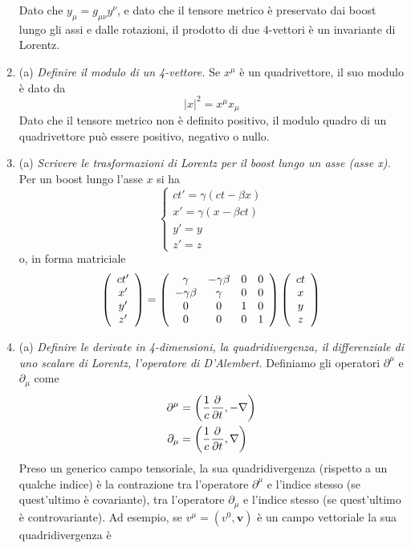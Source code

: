\documentclass{article}
\renewcommand{\a}{(a)}
\renewcommand{\t}[1]{\textit{ #1}}
\renewcommand{\vec}[1]{\mathbf{#1}}
\begin{document}
\begin{enumerate}
		Dato che $y_\mu=g_{\mu\nu}y^\nu$, e dato che il tensore metrico è preservato dai boost lungo gli assi e dalle rotazioni, il prodotto di due 4-vettori è un invariante di Lorentz.
		\item\a\t{Definire il modulo di un 4-vettore.} Se $x^\mu$ è un quadrivettore, il suo modulo è dato da
		\[|x|^2=x^\mu x_\mu\]
		Dato che il tensore metrico non è definito positivo, il modulo quadro di un quadrivettore può essere positivo, negativo o nullo.
		\item\a\t{Scrivere le trasformazioni di Lorentz per il boost lungo un asse (asse x).} Per un boost lungo l'asse $x$ si ha
		\[\begin{cases}
		ct'=\gamma(ct-\beta x)\\x'=\gamma(x-\beta ct)\\y'=y\\z'=z
		\end{cases}\]
		o, in forma matriciale
		\[\left(\begin{array}{c}
		ct'\\x'\\y'\\z'
		\end{array}\right)=\left(\begin{array}{c c c c}
		\gamma&-\gamma\beta&0&0\\-\gamma\beta&\gamma&0&0\\0&0&1&0\\0&0&0&1
		\end{array}\right)\left(\begin{array}{c}
		ct\\x\\y\\z
		\end{array}\right)\]
		\item\a\t{Definire le derivate in 4-dimensioni, la quadridivergenza, il differenziale di uno scalare di Lorentz, l'operatore di D'Alembert.} Definiamo gli operatori $\partial^\mu$ e $\partial_\mu$ come
		\begin{align*}
			\partial^\mu&=\left(\frac{1}{c}\pder{}{t},-\nabla\right)\\
			\partial_\mu&=\left(\frac{1}{c}\pder{}{t},\nabla\right)
		\end{align*}
		Preso un generico campo tensoriale, la sua quadridivergenza (rispetto a un qualche indice) è la contrazione tra l'operatore $\partial^\mu$ e l'indice stesso (se quest'ultimo è covariante), tra l'operatore $\partial_\mu$ e l'indice stesso (se quest'ultimo è controvariante). Ad esempio, se $v^\mu=(v^0,\vec{v})$ è un campo vettoriale la sua quadridivergenza è

\end{enumerate}
\end{document}
